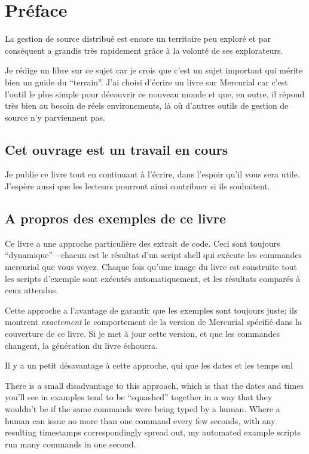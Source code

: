 \chapter*{Préface}
\label{chap:preface}

La gestion de source distribué est encore un territoire peu exploré
et par conséquent a grandis très rapidement grâce à la volonté de
ses explorateurs.

Je rédige un libre sur ce sujet car je crois que c'est un sujet 
important qui mérite bien un guide du ``terrain''. J'ai choisi d'écrire
un livre sur Mercurial car c'est l'outil le plus simple pour découvrir
ce nouveau monde et que, en outre, il répond très bien au besoin de
réels environements, là où d'autres outils de gestion de source n'y
parviennent pas.

\section{Cet ouvrage est un travail en cours}

Je publie ce livre tout en continuant à l'écrire, dans l'espoir qu'il
vous sera utile. J'espère aussi que les lecteurs pourront ainsi contribuer
si ils souhaitent.

\section{A propros des exemples de ce livre}

Ce livre a une approche particulière des extrait de code. Ceci sont 
toujours ``dynamique''---chacun est le résultat d'un script shell qui
exécute les commandes mercurial que vous voyez. Chaque fois qu'une 
image du livre est construite tout les scripts d'exemple sont exécutés
automatiquement, et les résultats comparés à ceux attendus.

Cette approche a l'avantage de garantir que les exemples sont toujours
juste; ils montrent \emph{exactement} le comportement de la version de
Mercurial spécifié dans la couverture de ce livre. Si je met à jour cette
version, et que les commandes changent, la génération du livre échouera.

Il y a un petit désavantage à cette approche, qui que les dates et les
temps onl

There is a small disadvantage to this approach, which is that the
dates and times you'll see in examples tend to be ``squashed''
together in a way that they wouldn't be if the same commands were
being typed by a human.  Where a human can issue no more than one
command every few seconds, with any resulting timestamps
correspondingly spread out, my automated example scripts run many
commands in one second.

